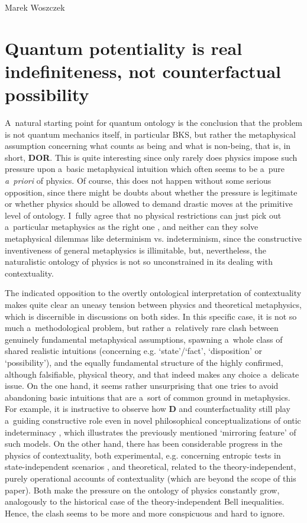 \begin{artengenv}{Marek Woszczek}
\section{Quantum potentiality is real indefiniteness, not counterfactual possibility}
A~natural starting point for quantum ontology is the conclusion that the problem is not quantum mechanics itself, in particular BKS, but rather the metaphysical assumption concerning what counts as being and what is non-being, that is, in short, \textbf{DOR}. This is quite interesting since only rarely does physics impose such pressure upon a~basic metaphysical intuition which often seems to be a~pure \textit{a~priori} of physics. Of course, this does not happen without some serious opposition, since there might be doubts about whether the pressure is legitimate or whether physics should be allowed to demand drastic moves at the primitive level of ontology. I~fully agree that no physical restrictions can just pick out a~particular metaphysics as the right one
\parencites[cf. e.g.][]{hawley_science_2006}[][]{french_2014}, %
 and neither can they solve metaphysical dilemmas like determinism vs. indeterminism, since the constructive inventiveness of general metaphysics is illimitable, but, nevertheless, the naturalistic ontology of physics is not so unconstrained in its dealing with contextuality.

The indicated opposition to the overtly ontological interpretation of contextuality makes quite clear an uneasy tension between physics and theoretical metaphysics, which is discernible in discussions on both sides. In this specific case, it is not so much a~methodological problem, but rather a~relatively rare clash between genuinely fundamental metaphysical assumptions, spawning a~whole class of shared realistic intuitions (concerning e.g. ‘state'/‘fact', ‘disposition' or ‘possibility'), and the equally fundamental structure of the highly confirmed, although falsifiable, physical theory, and that indeed makes any choice a~delicate issue. On the one hand, it seems rather unsurprising that one tries to avoid abandoning basic intuitions that are a~sort of common ground in metaphysics. For example, it is instructive to observe how \textbf{D} and counterfactuality still play a~guiding constructive role even in novel philosophical conceptualizations of ontic indeterminacy
\parencite[e.g.][]{akiba_vagueness_2004}, %
 which illustrates the previously mentioned ‘mirroring feature' of such models. On the other hand, there has been considerable progress in the physics of contextuality, both experimental, e.g. concerning entropic tests in state-independent scenarios 
\parencite[][]{qu_experimental_2020}, %
 and theoretical, related to the theory-independent, purely operational accounts of contextuality (which are beyond the scope of this paper). Both make the pressure on the ontology of physics constantly grow, analogously to the historical case of the theory-independent Bell inequalities. Hence, the clash seems to be more and more conspicuous and hard to ignore.


\end{artengenv}
